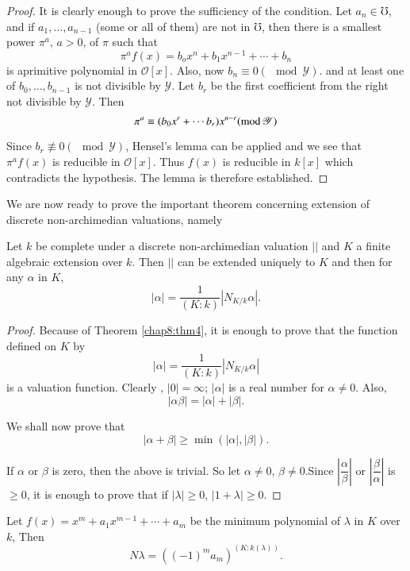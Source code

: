 \begin{proof}
It is clearly enough to prove the sufficiency of the condition. Let
$a_n \in \mho $, and if $a_1, \ldots, a_{n-1}$ (some or all of them)
are not in $\mho$, then there is a smallest power $\pi^a$, $a >
0$, of $\pi$ such that   
$$
\pi^a f(x) = b_o x^n + b_1 x^{ n-1} + \cdots + b_n  
$$
is a\pageoriginale primitive polynomial in $ \mathscr{O}
[x]$. Also, now $b_n \equiv 0 (\mod \mathscr{Y})$. and at least one of
$b_0,\ldots,b_{n-1}$ is not divisible by $\mathscr{Y}$. Let $b_r$ be
the first coefficient from the right not divisible by $\mathscr{Y}$. Then  
$$
\pi^a \equiv (b_ 0 x^r + \cdots b_r) x^{ n - r} ({\rm mod} \, \mathscr{Y})
$$

Since $b_r \not \equiv 0 (\mod \mathscr{Y})$, Hensel's lemma can be
applied and we see that $\pi ^a f(x)$ is reducible in $\mathscr{O}[x]
$. Thus $f(x)$ is reducible in $k [x]$ which contradicts the 
hypothesis. The lemma is therefore established.  
\end{proof}

We are now ready to prove the important theorem concerning extension of
discrete non-archimedian valuations, namely  

\begin{thm} %
 Let $k$ be complete under a discrete non-archimedian valuation
  $||$ and $K$ a finite algebraic extension over $k$. Then $||$ can be
  extended uniquely to $K$ and then for any $\alpha$  in $K$,  
$$
|\alpha | = \frac{1}{(K : k)} |N_{ K/k}\alpha|.
$$ 
\end{thm}

\begin{proof}
Because of Theorem \ref{chap8:thm4}, it is enough to prove that the
function defined on $K$ by   
$$
|\alpha | = \frac{1}{(K : k)}|N_{K/k}\alpha | 
$$
is a valuation function. Clearly , $|0| = \infty$; $ |\alpha| $ is a real
number for $\alpha \neq 0$. Also,  
$$
|\alpha \beta | = |\alpha| + |\beta |. 
$$

We shall now prove that 
$$
|\alpha + \beta | \geq \min (|\alpha| , |\beta|). 
$$

If $\alpha$ or $\beta $ is zero, then the above is trivial. So let
$\alpha \neq 0$, $\beta \neq 0$.\pageoriginale  Since $
\left|\dfrac{\alpha}{\beta} \right|$ or $\left|\dfrac{\beta}{\alpha}
\right|$ is $\geq 0$, it is enough to prove that if $|\lambda| \geq
0$, $| 1 +\lambda| \geq 0 $.   
\end{proof}

Let $f(x) =x^m + a_1 x^{ m - 1} + \cdots +a_m $ be the minimum
polynomial of $\lambda$ in $K$ over $k$, Then  
$$
N \lambda = ( (-1)^m a_m)^{(K : k (\lambda))}.
$$

